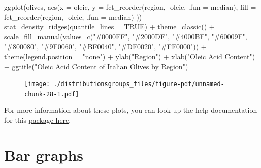 \documentclass[
  letterpaper,
  DIV=11,
  numbers=noendperiod]{scrreprt}
\newenvironment{Shaded}{\begin{snugshade}}{\end{snugshade}}
\newcommand{\AttributeTok}[1]{\textcolor[rgb]{0.40,0.45,0.13}{#1}}
\newcommand{\ConstantTok}[1]{\textcolor[rgb]{0.56,0.35,0.01}{#1}}
\newcommand{\FunctionTok}[1]{\textcolor[rgb]{0.28,0.35,0.67}{#1}}
\newcommand{\NormalTok}[1]{\textcolor[rgb]{0.00,0.23,0.31}{#1}}
\newcommand{\SpecialCharTok}[1]{\textcolor[rgb]{0.37,0.37,0.37}{#1}}
\newcommand{\StringTok}[1]{\textcolor[rgb]{0.13,0.47,0.30}{#1}}
\begin{document}
\begin{Shaded}
\begin{Highlighting}[]
\FunctionTok{ggplot}\NormalTok{(olives, }\FunctionTok{aes}\NormalTok{(}\AttributeTok{x =}\NormalTok{ oleic, }
                   \AttributeTok{y =} \FunctionTok{fct\_reorder}\NormalTok{(region, }\SpecialCharTok{{-}}\NormalTok{oleic, }\AttributeTok{.fun =}\NormalTok{ median), }
                   \AttributeTok{fill =} \FunctionTok{fct\_reorder}\NormalTok{(region, }\SpecialCharTok{{-}}\NormalTok{oleic, }\AttributeTok{.fun =}\NormalTok{ median)}
\NormalTok{                   )) }\SpecialCharTok{+}
  \FunctionTok{stat\_density\_ridges}\NormalTok{(}\AttributeTok{quantile\_lines =} \ConstantTok{TRUE}\NormalTok{) }\SpecialCharTok{+}
  \FunctionTok{theme\_classic}\NormalTok{() }\SpecialCharTok{+}
  \FunctionTok{scale\_fill\_manual}\NormalTok{(}\AttributeTok{values=}\FunctionTok{c}\NormalTok{(}\StringTok{"\#0000FF"}\NormalTok{, }\StringTok{"\#2000DF"}\NormalTok{, }\StringTok{"\#4000BF"}\NormalTok{, }\StringTok{"\#60009F"}\NormalTok{, }\StringTok{"\#800080"}\NormalTok{, }\StringTok{"\#9F0060"}\NormalTok{, }\StringTok{"\#BF0040"}\NormalTok{, }\StringTok{"\#DF0020"}\NormalTok{, }\StringTok{"\#FF0000"}\NormalTok{)) }\SpecialCharTok{+}
  \FunctionTok{theme}\NormalTok{(}\AttributeTok{legend.position =} \StringTok{"none"}\NormalTok{) }\SpecialCharTok{+}
  \FunctionTok{ylab}\NormalTok{(}\StringTok{"Region"}\NormalTok{) }\SpecialCharTok{+}
  \FunctionTok{xlab}\NormalTok{(}\StringTok{"Oleic Acid Content"}\NormalTok{) }\SpecialCharTok{+}
  \FunctionTok{ggtitle}\NormalTok{(}\StringTok{"Oleic Acid Content of Italian Olives by Region"}\NormalTok{)}
\end{Highlighting}
\end{Shaded}

\begin{figure}[H]

{\centering \texttt{[image: ./distributionsgroups\_files/figure-pdf/unnamed-chunk-28-1.pdf]}

}

\end{figure}

For more information about these plots, you can look up the help
documentation for this
\href{https://cran.r-project.org/web/packages/ggridges/vignettes/introduction.html}{package
here}.


\hypertarget{bar-graphs}{%
\chapter{Bar graphs}\label{bar-graphs}}
\end{document}
